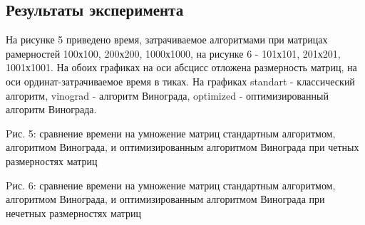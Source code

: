 \documentclass[a4paper, 14pt]{article}
\begin{document}
		\subsection{Результаты эксперимента}
		На рисунке 5 приведено время, затрачиваемое алгоритмами при матрицах рамерностей 100х100, 200х200, 1000х1000, на рисунке 6 - 101х101, 201х201, 1001х1001. На обоих графиках на оси абсцисс отложена размерность матриц, на оси ординат-затрачиваемое время в тиках. На графиках standart - классический алгоритм, vinograd - алгоритм Винограда, optimized - оптимизированный алгоритм Винограда.
\begin{center}
\newline

Pис. 5: сравнение времени на умножение матриц стандартным алгоритмом, алгоритмом Винограда, и оптимизированным алгоритмом Винограда при четных размерностях матриц\\

\newline


Pис. 6: сравнение времени на умножение матриц стандартным алгоритмом, алгоритмом Винограда, и оптимизированным алгоритмом Винограда при нечетных размерностях матриц\\

\end{center}
	
\end{document}
